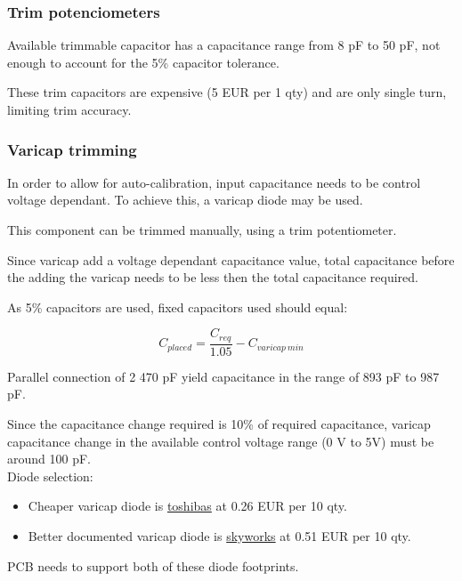 \documentclass[11pt]{article}
\begin{document}
\subsubsection{Trim potenciometers}
Available trimmable capacitor has a capacitance range from 8 pF to 50 pF, not 
enough to account for the 5\% capacitor tolerance.

These trim capacitors are expensive (5 EUR per 1 qty) and are only single turn,
limiting trim accuracy. 


\subsubsection{Varicap trimming}
In order to allow for auto-calibration, input capacitance needs to be control
voltage dependant. To achieve this, a varicap diode may be used.

This component can be trimmed manually, using a trim potentiometer.

Since varicap add a voltage dependant capacitance value, total capacitance before
the adding the varicap needs to be less then the total capacitance required. 

As 5\% capacitors are used, fixed capacitors used should equal:

\begin{equation}
  C_{placed} = \frac{C_{req}}{1.05} - C_{varicap\ min}
  \label{eq:}
\end{equation}

Parallel connection of 2 470 pF yield capacitance in the range of 893 pF to 987 pF.

Since the capacitance change required is 10\% of required capacitance, varicap 
capacitance change in the available control voltage range (0 V to 5V) must be around
100 pF.\\

Diode selection:
\begin{itemize}
  \item Cheaper varicap diode is \href{https://eu.mouser.com/ProductDetail/Toshiba/1SV324TPH3F?qs=EEns8I54Y6DPMP6VMy8m2w%3D%3D}{toshibas}
  at 0.26 EUR per 10 qty. 

  \item Better documented varicap diode is \href{https://eu.mouser.com/ProductDetail/Skyworks-Solutions-Inc/SMV1255-079LF?qs=WMHGlxXAKT8jslp0hTOZuw%3D%3D}{skyworks} 
  at 0.51 EUR per 10 qty. 
\end{itemize}

PCB needs to support both of these diode footprints.
\end{document}
